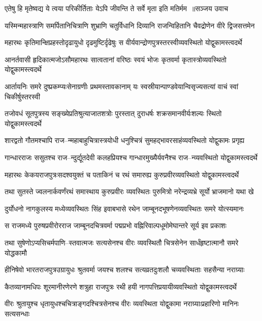 \threelineshloka
{एतेषु हि मृतेष्वद्य ये त्वया परिकीर्तिताः}
{येऽपि जीवन्ति ते सर्वे मृता इति मतिर्मम ॥सञ्जय उवाच}
{}


\twolineshloka
{यस्मिन्महास्त्राणि समर्पितानिचित्राणि शुभ्राणि चतुर्विधानि}
{दिव्यानि राजन्विहितानि चैवद्रोणेन वीरे द्विजसत्तमेन}


\twolineshloka
{महारथः कृतिमान्क्षिप्रहस्तोदृढायुधो दृढमुष्टिर्दृढेषुः}
{स वीर्यवान्द्रोणपुत्रस्तरस्वीव्यवस्थितो योद्वुकामस्त्वदर्थे}


\twolineshloka
{आनर्तवासी हृदिकात्मजोऽसौमहारथः सात्वतानां वरिष्ठः}
{स्वयं भोजः कृतवर्मा कृतास्त्रोव्यवस्थितो योद्वुकामस्त्वदर्थे}


\twolineshloka
{आर्तायनिः समरे दुष्प्रकम्प्यःसेनाग्रणीः प्रथमस्तावकानाम्}
{यः स्वस्रीयान्पाण्डवेयान्विसृज्यसत्यां वाचं स्वां चिकीर्षुस्तरस्वी}


\twolineshloka
{तजोवधं सूतपुत्रस्य सङ्ख्येप्रतिश्रुत्याजातशत्रोः पुरस्तात्}
{दुराधर्षः शक्रसमानवीर्यःशल्यः स्थितो योद्वुकामस्त्वदर्थे}


\twolineshloka
{शारद्वतो गौतमश्चापि राज--न्महाबाहुचित्रास्त्रयोधी}
{धनुश्चित्रं सुमहद्भावरसाहंव्यवस्थितो योद्वुकामः प्रगृह्य}


\twolineshloka
{गान्धारराजः ससुतश्च राज--न्दुर्द्यूतदेवी कलहप्रियश्च}
{गान्धारमुख्यैर्यवनैश्च राज--न्व्यवस्थितो योद्वुकामस्त्वदर्थे}


\twolineshloka
{महारथः केकयराजपुत्रःसदश्वयुक्तं च पताकिनं च}
{रथं समारुह्य कुरुप्रवीरव्यवस्थितो योद्वुकामस्त्वदर्थे}


\twolineshloka
{तथा सुतस्ते ज्वलनार्कवर्णंरथं समास्थाय कुरुप्रवीरः}
{व्यवस्थितः पुरुमित्रो नरेन्द्रव्यभ्रे सूर्यो भ्राजमानो यथा खे}


\twolineshloka
{दुर्योधनो नागकुलस्य मध्येव्यवस्थितः सिंह इवाबभासे}
{रथेन जाम्बूनदभूषणेनव्यवस्थितः समरे योत्स्यमानः}


\twolineshloka
{स राजमध्ये पुरुषप्रवीरोरराज जाम्बूनदचित्रवर्मा}
{पद्मप्रभो वह्निरिवाल्पधूमोमेघान्तरे सूर्य इव प्रकाशः}


\twolineshloka
{तथा सुषेणोऽप्यसिचर्मपाणि--स्तवात्मजः सत्यसेनश्च वीरः}
{व्यवस्थितौ चित्रसेनेन सार्धंहृष्टात्मानौ समरे योद्धकामौ}


\twolineshloka
{हीनिषेवो भारतराजपुत्रउग्रायुधः श्रुतवर्मा जयश्च}
{शलश्च सत्यव्रतदुःशलौ चव्यवस्थिताः सहसैन्या नराग्र्याः}


\twolineshloka
{कैतव्यानामधिपः शूरमानीरणेरणे शत्रुहा राजपुत्रः}
{रथी हयी नागपत्तिप्रयायीव्यवस्थितो योद्वुकामस्त्वदर्थे}


\twolineshloka
{वीरः श्रुतायुश्च धृतायुधश्चचित्राङ्गदश्चित्रसेनश्च वीरः}
{व्यवस्थिता योद्वुकामा नराग्र्याःप्रहारिणो मानिनः सत्यसन्धाः}


